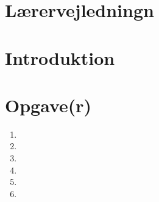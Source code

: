 \documentclass[a4paper,12pt]{article}
\title{\chess}
\author{Jon Sporring}
\begin{document}
\maketitle

\section{Lærervejledningn}

\section{Introduktion}

\section{Opgave(r)}
\begin{enumerate}
\item 
\item 
\item 
\item 
\item 
\item 
\end{enumerate}
\end{document}
